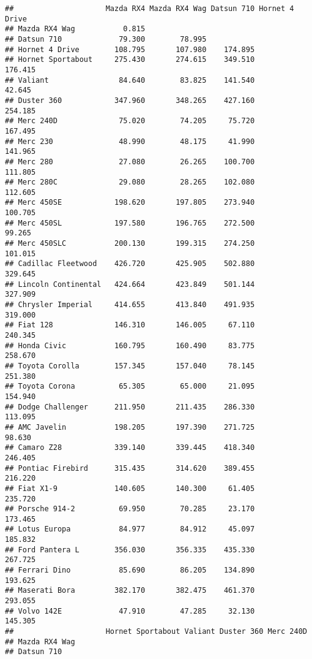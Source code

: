 \documentclass[]{book}
\begin{document}
\begin{verbatim}
##                     Mazda RX4 Mazda RX4 Wag Datsun 710 Hornet 4 Drive
## Mazda RX4 Wag           0.815                                        
## Datsun 710             79.300        78.995                          
## Hornet 4 Drive        108.795       107.980    174.895               
## Hornet Sportabout     275.430       274.615    349.510        176.415
## Valiant                84.640        83.825    141.540         42.645
## Duster 360            347.960       348.265    427.160        254.185
## Merc 240D              75.020        74.205     75.720        167.495
## Merc 230               48.990        48.175     41.990        141.965
## Merc 280               27.080        26.265    100.700        111.805
## Merc 280C              29.080        28.265    102.080        112.605
## Merc 450SE            198.620       197.805    273.940        100.705
## Merc 450SL            197.580       196.765    272.500         99.265
## Merc 450SLC           200.130       199.315    274.250        101.015
## Cadillac Fleetwood    426.720       425.905    502.880        329.645
## Lincoln Continental   424.664       423.849    501.144        327.909
## Chrysler Imperial     414.655       413.840    491.935        319.000
## Fiat 128              146.310       146.005     67.110        240.345
## Honda Civic           160.795       160.490     83.775        258.670
## Toyota Corolla        157.345       157.040     78.145        251.380
## Toyota Corona          65.305        65.000     21.095        154.940
## Dodge Challenger      211.950       211.435    286.330        113.095
## AMC Javelin           198.205       197.390    271.725         98.630
## Camaro Z28            339.140       339.445    418.340        246.405
## Pontiac Firebird      315.435       314.620    389.455        216.220
## Fiat X1-9             140.605       140.300     61.405        235.720
## Porsche 914-2          69.950        70.285     23.170        173.465
## Lotus Europa           84.977        84.912     45.097        185.832
## Ford Pantera L        356.030       356.335    435.330        267.725
## Ferrari Dino           85.690        86.205    134.890        193.625
## Maserati Bora         382.170       382.475    461.370        293.055
## Volvo 142E             47.910        47.285     32.130        145.305
##                     Hornet Sportabout Valiant Duster 360 Merc 240D
## Mazda RX4 Wag                                                     
## Datsun 710                                                        

\end{verbatim}
\end{document}
